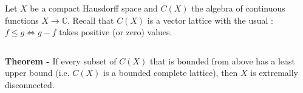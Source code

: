 \documentclass[12pt]{article}
\begin{document}
Let $X$ be a compact Hausdorff space and $C(X)$ the algebra of continuous functions $X \longrightarrow \mathbb{C}$. Recall that $C(X)$ is a vector lattice with the usual : $f\leq g \Longleftrightarrow g-f$ takes positive (or zero) values.

$\,$

{\bf Theorem - } If every subset of $C(X)$ that is bounded from above has a least upper bound (i.e. $C(X)$ is a bounded complete lattice), then $X$ is extremally disconnected.
\end{document}
